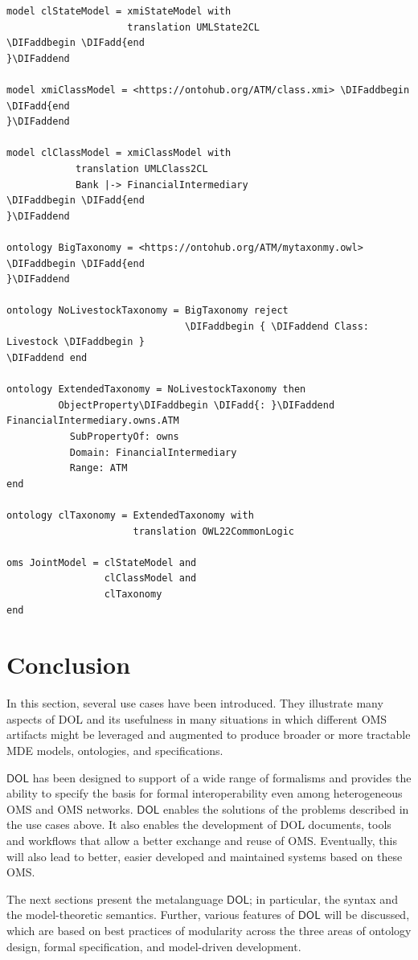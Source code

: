 \documentclass[10pt,fleqn,final]{scrreprt}
\newcommand*{\DOL}{\ensuremath{\mathsf{DOL}}\xspace}
\newenvironment{definitions}[0]{\medskip }{}
\providecommand{\DIFadd}[1]{{\protect\color{blue}\uwave{#1}}} %
\providecommand{\DIFaddbegin}{} %
\providecommand{\DIFaddend}{} %
\begin{document}
\begin{definitions}
\begin{lstlisting}[basicstyle=\ttfamily\small,language=dolText,alsolanguage=owl2Manchester,escapechar=@,mathescape]
model clStateModel = xmiStateModel with
                     translation UMLState2CL
\DIFaddbegin \DIFadd{end
}\DIFaddend 

model xmiClassModel = <https://ontohub.org/ATM/class.xmi> \DIFaddbegin \DIFadd{end
}\DIFaddend 

model clClassModel = xmiClassModel with
            translation UMLClass2CL
            Bank |-> FinancialIntermediary
\DIFaddbegin \DIFadd{end
}\DIFaddend 

ontology BigTaxonomy = <https://ontohub.org/ATM/mytaxonmy.owl> \DIFaddbegin \DIFadd{end
}\DIFaddend 

ontology NoLivestockTaxonomy = BigTaxonomy reject
                               \DIFaddbegin { \DIFaddend Class: Livestock \DIFaddbegin }
\DIFaddend end

ontology ExtendedTaxonomy = NoLivestockTaxonomy then
         ObjectProperty\DIFaddbegin \DIFadd{: }\DIFaddend FinancialIntermediary.owns.ATM
           SubPropertyOf: owns
           Domain: FinancialIntermediary
           Range: ATM
end

ontology clTaxonomy = ExtendedTaxonomy with
                      translation OWL22CommonLogic

oms JointModel = clStateModel and
                 clClassModel and
                 clTaxonomy
end
\end{lstlisting}

\section{Conclusion}

In this section, several use cases have been introduced. They illustrate many aspects of DOL and its usefulness in many situations in which different OMS artifacts might be leveraged and augmented to produce broader or more tractable MDE models, ontologies, and specifications.

 \DOL has been designed to support of a wide range of formalisms and
provides the ability to specify the basis for formal interoperability even among heterogeneous OMS and OMS networks. \DOL enables the solutions of the problems described in the use cases above. It also enables the development of DOL documents, tools and workflows that 
allow  a better exchange and reuse of OMS. Eventually, this will also lead to better, easier developed and maintained systems based on these OMS.

The next sections present the metalanguage \DOL{}; in particular, the syntax and the model-theoretic semantics. Further, various features of \DOL will be discussed, which  are based on  best practices of modularity  across
 the three areas of ontology design, formal 
specification, and model-driven development.





\end{definitions}
\end{document}

